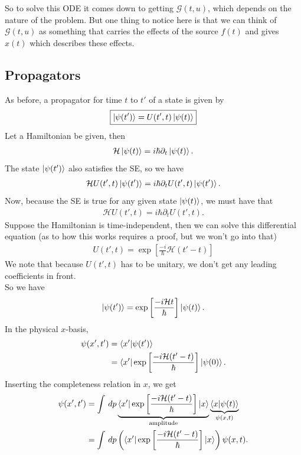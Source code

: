 \documentclass{book}
\theoremstyle{definition}
\newcommand{\p}{\partial}
\newcommand{\ham}{\mathcal{H}}
\newcommand{\G}{\mathcal{G}}
\newcommand{\f}[2]{\frac{#1}{#2}}
\newcommand{\lp}{\left(}
\newcommand{\rp}{\right)}
\newcommand{\lb}{\left[}
\newcommand{\rb}{\right]}
\begin{document}
So to solve this ODE it comes down to getting $\G(t,u)$, which depends on the nature of the problem. But one thing to notice here is that we can think of $\G(t,u)$ as something that carries the effects of the source $f(t)$ and gives $x(t)$ which describes these effects. 




\subsection{Propagators}



As before, a propagator for time $t$ to $t'$ of a state is given by
\begin{align}
\boxed{\ket{\psi(t')} = U(t',t)\ket{\psi(t)}}
\end{align}
Let a Hamiltonian be given, then
\begin{align}
\ham \ket{\psi(t)} = i\hbar \p_t \ket{\psi(t)}.
\end{align}
The state $\ket{\psi(t')}$ also satisfies the SE, so we have
\begin{align}
\ham U(t',t)\ket{\psi(t')} = i\hbar \p_t U(t',t)\ket{\psi(t')}.
\end{align}
Now, because the SE is true for any given state $\ket{\psi(t)}$, we must have that
\begin{align}
\ham U(t',t) = i\hbar \p_t U(t',t).
\end{align}
Suppose the Hamiltonian is time-independent, then we can solve this differential equation (as to how this works requires a proof, but we won't go into that)
\begin{align}
\boxed{U(t',t) = \exp\lb \f{-i}{\hbar}\ham (t'-t) \rb}
\end{align}
We note that because $U(t',t)$ has to be unitary, we don't get any leading coefficients in front. \\

So we have
\begin{align}
\ket{\psi(t')} = \exp \lb \f{-i \ham t}{\hbar} \rb \ket{\psi(t)}.
\end{align}
In the physical $x$-basis, 
\begin{align}
\psi(x',t') &= \bra{x'}\ket{\psi(t')}\\
&= \bra{x'}\exp \lb \f{-i \ham (t'-t)}{\hbar} \rb \ket{\psi(0)}.
\end{align}
Inserting the completeness relation in $x$, we get
\begin{align}
\psi(x',t') &= \int \,dp \underbrace{ \bra{x'}\exp \lb \f{-i \ham (t'-t)}{\hbar} \rb \ket{x}}_{\text{amplitude}}\underbrace{\braket{x}{\psi(t)}}_{\psi(x,t)}\\ 
&=  \int \,dp \lp \bra{x'}\exp \lb \f{-i \ham (t'-t)}{\hbar} \rb \ket{x} \rp \psi(x,t).
\end{align}
\end{document}
